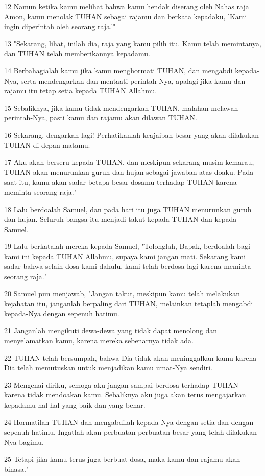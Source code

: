 \par 12 Namun ketika kamu melihat bahwa kamu hendak diserang oleh Nahas raja Amon, kamu menolak TUHAN sebagai rajamu dan berkata kepadaku, 'Kami ingin diperintah oleh seorang raja.'"
\par 13 "Sekarang, lihat, inilah dia, raja yang kamu pilih itu. Kamu telah memintanya, dan TUHAN telah memberikannya kepadamu.
\par 14 Berbahagialah kamu jika kamu menghormati TUHAN, dan mengabdi kepada-Nya, serta mendengarkan dan mentaati perintah-Nya, apalagi jika kamu dan rajamu itu tetap setia kepada TUHAN Allahmu.
\par 15 Sebaliknya, jika kamu tidak mendengarkan TUHAN, malahan melawan perintah-Nya, pasti kamu dan rajamu akan dilawan TUHAN.
\par 16 Sekarang, dengarkan lagi! Perhatikanlah keajaiban besar yang akan dilakukan TUHAN di depan matamu.
\par 17 Aku akan berseru kepada TUHAN, dan meskipun sekarang musim kemarau, TUHAN akan menurunkan guruh dan hujan sebagai jawaban atas doaku. Pada saat itu, kamu akan sadar betapa besar dosamu terhadap TUHAN karena meminta seorang raja."
\par 18 Lalu berdoalah Samuel, dan pada hari itu juga TUHAN menurunkan guruh dan hujan. Seluruh bangsa itu menjadi takut kepada TUHAN dan kepada Samuel.
\par 19 Lalu berkatalah mereka kepada Samuel, "Tolonglah, Bapak, berdoalah bagi kami ini kepada TUHAN Allahmu, supaya kami jangan mati. Sekarang kami sadar bahwa selain dosa kami dahulu, kami telah berdosa lagi karena meminta seorang raja."
\par 20 Samuel pun menjawab, "Jangan takut, meskipun kamu telah melakukan kejahatan itu, janganlah berpaling dari TUHAN, melainkan tetaplah mengabdi kepada-Nya dengan sepenuh hatimu.
\par 21 Janganlah mengikuti dewa-dewa yang tidak dapat menolong dan menyelamatkan kamu, karena mereka sebenarnya tidak ada.
\par 22 TUHAN telah bersumpah, bahwa Dia tidak akan meninggalkan kamu karena Dia telah memutuskan untuk menjadikan kamu umat-Nya sendiri.
\par 23 Mengenai diriku, semoga aku jangan sampai berdosa terhadap TUHAN karena tidak mendoakan kamu. Sebaliknya aku juga akan terus mengajarkan kepadamu hal-hal yang baik dan yang benar.
\par 24 Hormatilah TUHAN dan mengabdilah kepada-Nya dengan setia dan dengan sepenuh hatimu. Ingatlah akan perbuatan-perbuatan besar yang telah dilakukan-Nya bagimu.
\par 25 Tetapi jika kamu terus juga berbuat dosa, maka kamu dan rajamu akan binasa."

